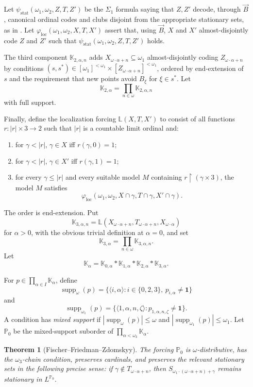 \documentclass[11pt]{article}
\theoremstyle{plain}
\newtheorem{theorem}{Theorem}[section]
\theoremstyle{definition}
\theoremstyle{remark}
\newcommand{\Pp}{\mathbb P}
\newcommand{\Kk}{\mathbb K}
\newcommand{\Ll}{\mathbb L}
\newcommand{\supp}{\operatorname{supp}}
\begin{document}
Let $\psi_{\mathrm{stat}}(\omega_1,\omega_2,Z,T,Z')$ be the $\Sigma_1$ formula
saying that $Z,Z'$ decode, through $\vec B$, canonical ordinal codes and clubs
disjoint from the appropriate stationary sets, as in \cite[Section 2]{FISCHER2013763}.
Let $\varphi_{\mathrm{loc}}(\omega_1,\omega_2,X,T,X')$ assert that, using
$\vec B$, $X$ and $X'$ almost-disjointly code $Z$ and $Z'$ such that
$\psi_{\mathrm{stat}}(\omega_1,\omega_2,Z,T,Z')$ holds.

The third component $\Kk_{2,\alpha,n}$ adds
$X_{\omega\cdot\alpha+n}\subseteq\omega_1$ almost-disjointly coding
$Z_{\omega\cdot\alpha+n}$ by conditions
$(s,s^*)\in[\omega_1]^{<\omega_1}\times[Z_{\omega\cdot\alpha+n}]^{<\omega_1}$,
ordered by end-extension of $s$ and the requirement that new points avoid
$B_\xi$ for $\xi\in s^*$.  Let
\[
\Kk_{2,\alpha}=\prod_{n\in\omega}\Kk_{2,\alpha,n}
\]
with full support.

Finally, define the localization forcing $\Ll(X,T,X')$ to consist of all
functions $r:|r|\times 3\to 2$ such that $|r|$ is a countable limit ordinal and:
\begin{enumerate}[label=(\arabic*)]
\item for $\gamma<|r|$, $\gamma\in X$ iff $r(\gamma,0)=1$;
\item for $\gamma<|r|$, $\gamma\in X'$ iff $r(\gamma,1)=1$;
\item for every $\gamma\leq |r|$ and every suitable model $M$ containing
$r\upharpoonright(\gamma\times 3)$, the model $M$ satisfies
\[
\varphi_{\mathrm{loc}}(\omega_1,\omega_2,X\cap\gamma,T\cap\gamma,X'\cap\gamma).
\]
\end{enumerate}
The order is end-extension.  Put
\[
\Kk_{3,\alpha,n}=\Ll(X_{\omega\cdot\alpha+n},T_{\omega\cdot\alpha+n},
X_{\omega\cdot\alpha})
\]
for $\alpha>0$, with the obvious trivial definition at $\alpha=0$, and set
\[
\Kk_{3,\alpha}=\prod_{n\in\omega}\Kk_{3,\alpha,n}.
\]
Let
\[
\Kk_\alpha=\Kk_{0,\alpha}*\Kk_{1,\alpha}*\Kk_{2,\alpha}*\Kk_{3,\alpha}.
\]

For $p\in\prod_{\alpha\in I}\Kk_\alpha$, define
\[
\supp_\omega(p)=\{\langle i,\alpha\rangle:i\in\{0,2,3\},\ p_{i,\alpha}\neq\mathbf 1\}
\]
and
\[
\supp_{\omega_1}(p)=\{\langle 1,\alpha,n,\zeta\rangle:p_{1,\alpha,n,\zeta}\neq\mathbf 1\}.
\]
A condition has \emph{mixed support} if $|\supp_\omega(p)|\leq\omega$ and
$|\supp_{\omega_1}(p)|\leq\omega_1$.  Let $\Pp_0$ be the mixed-support suborder of
$\prod_{\alpha<\omega_3}\Kk_\alpha$.

\begin{theorem}[Fischer--Friedman--Zdomskyy]\label{thm:ffdz-preliminary}
The forcing $\Pp_0$ is $\omega$-distributive, has the $\omega_3$-chain condition,
preserves cardinals, and preserves the relevant stationary sets in the following
precise sense: if $\gamma\notin T_{\omega\cdot\alpha+n}$, then
$S_{\omega_1\cdot(\omega\cdot\alpha+n)+\gamma}$ remains stationary in
$L^{\Pp_0}$.
\end{theorem}
\end{document}
